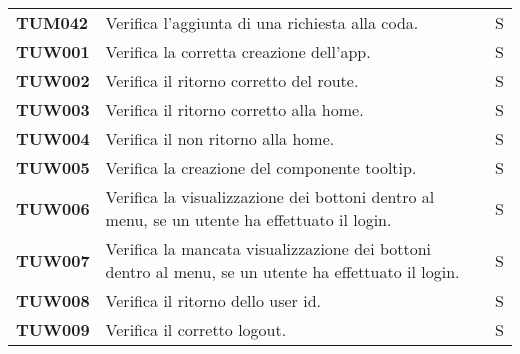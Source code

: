 \documentclass[../../piano-di-qualifica.tex]{subfiles}
\begin{document}
\begin{longtable}[H]{>{\centering\bfseries}m{3cm} >{}m{10cm} >{\centering\arraybackslash}m{3cm}}
  TUM042             & Verifica l'aggiunta di una richiesta alla coda.                                                                     & S                             \\ %



  TUW001             & Verifica la corretta creazione dell'app.                                                                            & S                             \\

  TUW002             & Verifica il ritorno corretto del route.                                                                             & S                             \\

  TUW003             & Verifica il ritorno corretto alla home.                                                                             & S                             \\

  TUW004             & Verifica il non ritorno alla home.                                                                                  & S                             \\

  TUW005             & Verifica la creazione del componente tooltip.                                                                       & S                             \\

  TUW006             & Verifica la visualizzazione dei bottoni dentro al menu, se un utente ha effettuato il login.                        & S                             \\

  TUW007             & Verifica la mancata visualizzazione dei bottoni dentro al menu, se un utente ha effettuato il login.                & S                             \\

  TUW008             & Verifica il ritorno dello user id.                                                                                  & S                             \\

  TUW009             & Verifica il corretto logout.                                                                                        & S                             \\


\end{longtable}
\end{document}
